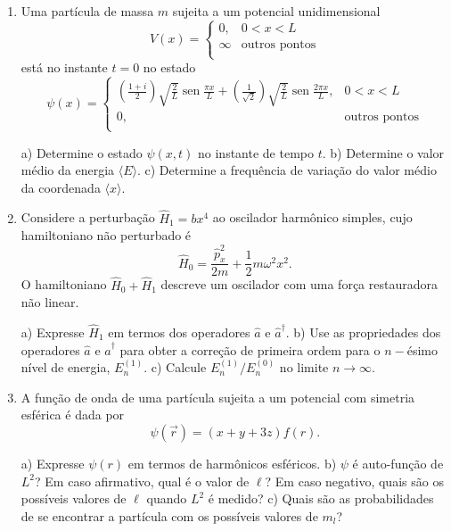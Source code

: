 \begin{enumerate}[start=1,label={\bfseries Q\arabic*.}]
\item Uma partícula de massa $m$ sujeita a um potencial unidimensional
$$
V(x) = \left\{
         \begin{array}{cc}
           0, & 0 < x < L \\
           \infty & \mbox{outros pontos}\\
         \end{array}
       \right.
$$
está no instante $t = 0$ no estado
$$
\psi(x) = \left\{
         \begin{array}{cc}
           \left( \frac{1+i}{2} \right) \sqrt{\frac{2}{L}} \operatorname{sen} \frac{\pi x}{L} + \left( \frac{1}{\sqrt{2}} \right) \sqrt{\frac{2}{L}} \operatorname{sen} \frac{2 \pi x}{L} , & 0 < x < L \\
           0, & \mbox{outros pontos}\\
         \end{array}
       \right.
$$

a) Determine o estado $\psi(x,t)$ no instante de tempo $t$.
b) Determine o valor médio da energia $\langle E \rangle$.
c) Determine a frequência de variação do valor médio da coordenada $\langle x \rangle$.



\item Considere a perturbação $\hat{H}_{1} = bx^{4}$ ao oscilador harmônico simples, cujo hamiltoniano não perturbado é
$$
\hat{H}_{0} = \frac{\hat{p}^{2}_{x}}{2m} + \frac{1}{2} m \omega^{2} x^{2}.
$$
O hamiltoniano $\hat{H}_{0} + \hat{H}_{1}$ descreve um oscilador com uma força restauradora não linear.

a) Expresse $\hat{H}_{1}$ em termos dos operadores $\hat{a}$ e $\hat{a}^{\dagger}$.
b) Use as propriedades dos operadores $\hat{a}$ e $\hat{a}^{\dagger}$ para obter a correção de primeira ordem para o $n-$ésimo nível de energia, $E_{n}^{(1)}$.
c) Calcule $E_{n}^{(1)} / E_{n}^{(0)}$ no limite $n \rightarrow \infty$.



\item A função de onda de uma partícula sujeita a um potencial com simetria esférica é dada por
 $$
 \psi (\vec{r}) = (x + y + 3z)f(r).
 $$

a) Expresse  $\psi(r)$ em termos de harmônicos esféricos.
b) $\psi$ é auto-função de $L^{2}$? Em caso afirmativo, qual é o valor de $\ell$? Em caso negativo, quais são os possíveis valores de $\ell$ quando $L^{2}$ é medido?
c) Quais são as probabilidades de se encontrar a partícula com os possíveis valores de $m_{l}$?






\end{enumerate}
